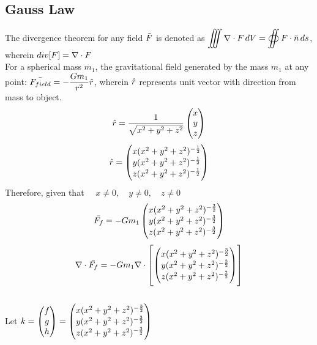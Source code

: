 \documentclass[a4paper, 12pt]{report}
\begin{document}
\begin{center}
\chapter{Gauss Law}
\begin{comment}
\end{comment}
\begin{comment}
\end{comment}
The divergence theorem for any field $\bar{F}$ is denoted as $\displaystyle{\iiint \nabla\cdot F \,dV =  \oiint {F \cdot\bar{n}}\,ds }$, wherein $div[F] = \nabla \cdot F$
\\For a spherical mass $m_1$, the gravitational field generated by the mass $m_1$ at any point: $\displaystyle{\bar{F_{field}} = -\frac{Gm_1}{r^2}\hat{r}}$, wherein $\hat{r}$ represents unit vector with direction from mass to object. 
$$\displaystyle{\hat{r} = \frac{1}{\sqrt{x^2 + y^2 + z^2}}\begin{pmatrix} x\\y\\z \end{pmatrix}}$$
$$\hat{r} = \begin{pmatrix} x(x^2+y^2+z^2)^{-\frac{1}{2}}\\y(x^2+y^2+z^2)^{-\frac{1}{2}} \\z(x^2+y^2+z^2)^{-\frac{1}{2}} \end{pmatrix}$$
Therefore, given that $\quad x \neq 0,\quad y \neq 0, \quad z \neq 0$
$$\bar{F_f} = -Gm_1\begin{pmatrix} x(x^2+y^2+z^2)^{-\frac{3}{2}}\\y(x^2+y^2+z^2)^{-\frac{3}{2}} \\z(x^2+y^2+z^2)^{-\frac{3}{2}} \end{pmatrix}$$
$$\nabla \cdot \bar{F_f} =-Gm_1\nabla \cdot \left[\begin{pmatrix} x(x^2+y^2+z^2)^{-\frac{3}{2}}\\y(x^2+y^2+z^2)^{-\frac{3}{2}} \\z(x^2+y^2+z^2)^{-\frac{3}{2}} \end{pmatrix}\right]$$
\\Let $\displaystyle{k =\begin{pmatrix} f\\g\\h\end{pmatrix}= \begin{pmatrix} x(x^2+y^2+z^2)^{-\frac{3}{2}}\\y(x^2+y^2+z^2)^{-\frac{3}{2}} \\z(x^2+y^2+z^2)^{-\frac{3}{2}} \end{pmatrix}}$

\end{center}
\end{document}
